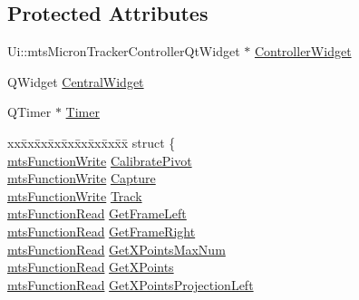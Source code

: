 \subsection*{Protected Attributes}
\begin{DoxyCompactItemize}
\item 
Ui\+::mts\+Micron\+Tracker\+Controller\+Qt\+Widget $\ast$ \hyperlink{classmts_micron_tracker_controller_qt_component_af0e9d2db7eabf1b7a405f93ce0ba48eb}{Controller\+Widget}
\item 
Q\+Widget \hyperlink{classmts_micron_tracker_controller_qt_component_a3dbbb592a657af89f0d956cfe3192a21}{Central\+Widget}
\item 
Q\+Timer $\ast$ \hyperlink{classmts_micron_tracker_controller_qt_component_a6f10236718137e39ed23b3d8b44450db}{Timer}
\item 
\begin{tabbing}
xx\=xx\=xx\=xx\=xx\=xx\=xx\=xx\=xx\=\kill
struct \{\\
\>\hyperlink{classmts_function_write}{mtsFunctionWrite} \hyperlink{classmts_micron_tracker_controller_qt_component_a9d2f06a80735cb7683087a3b6c182d0f}{CalibratePivot}\\
\>\hyperlink{classmts_function_write}{mtsFunctionWrite} \hyperlink{classmts_micron_tracker_controller_qt_component_a84845dc8f1102c8cad725dc4af8714f6}{Capture}\\
\>\hyperlink{classmts_function_write}{mtsFunctionWrite} \hyperlink{classmts_micron_tracker_controller_qt_component_a84667286a3af7870d553d47b1a012495}{Track}\\
\>\hyperlink{classmts_function_read}{mtsFunctionRead} \hyperlink{classmts_micron_tracker_controller_qt_component_a1ea05a723f36ecdbbf6d0a6b5d3a5da3}{GetFrameLeft}\\
\>\hyperlink{classmts_function_read}{mtsFunctionRead} \hyperlink{classmts_micron_tracker_controller_qt_component_a03286c9e24bcfb6b4f2844d32a810acc}{GetFrameRight}\\
\>\hyperlink{classmts_function_read}{mtsFunctionRead} \hyperlink{classmts_micron_tracker_controller_qt_component_a60560b239aeaa2195956432d427c1953}{GetXPointsMaxNum}\\
\>\hyperlink{classmts_function_read}{mtsFunctionRead} \hyperlink{classmts_micron_tracker_controller_qt_component_a13d765e020c059185fa31693a27c589f}{GetXPoints}\\
\>\hyperlink{classmts_function_read}{mtsFunctionRead} \hyperlink{classmts_micron_tracker_controller_qt_component_a87c6b979f25a860d9366410f629d174e}{GetXPointsProjectionLeft}\\

\end{tabbing}
\end{DoxyCompactItemize}
